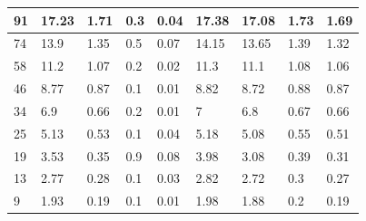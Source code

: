 \documentclass{article}
\begin{document}
\begin{table}[]
\begin{tabular}{|l|l|l|l|l|l|l|l|l|}
91                                                                              & 17.23                 & 1.71                  & 0.3                   & 0.04                  & 17.38                 & 17.08                 & 1.73                  & 1.69                  \\ \hline
74                                                                              & 13.9                  & 1.35                  & 0.5                   & 0.07                  & 14.15                 & 13.65                 & 1.39                  & 1.32                  \\ \hline
58                                                                              & 11.2                  & 1.07                  & 0.2                   & 0.02                  & 11.3                  & 11.1                  & 1.08                  & 1.06                  \\ \hline
46                                                                              & 8.77                  & 0.87                  & 0.1                   & 0.01                  & 8.82                  & 8.72                  & 0.88                  & 0.87                  \\ \hline
34                                                                              & 6.9                   & 0.66                  & 0.2                   & 0.01                  & 7                     & 6.8                   & 0.67                  & 0.66                  \\ \hline
25                                                                              & 5.13                  & 0.53                  & 0.1                   & 0.04                  & 5.18                  & 5.08                  & 0.55                  & 0.51                  \\ \hline
19                                                                              & 3.53                  & 0.35                  & 0.9                   & 0.08                  & 3.98                  & 3.08                  & 0.39                  & 0.31                  \\ \hline
13                                                                              & 2.77                  & 0.28                  & 0.1                   & 0.03                  & 2.82                  & 2.72                  & 0.3                   & 0.27                  \\ \hline
9                                                                               & 1.93                  & 0.19                  & 0.1                   & 0.01                  & 1.98                  & 1.88                  & 0.2                   & 0.19                  \\ \hline

\end{tabular}
\end{table}
\end{document}
